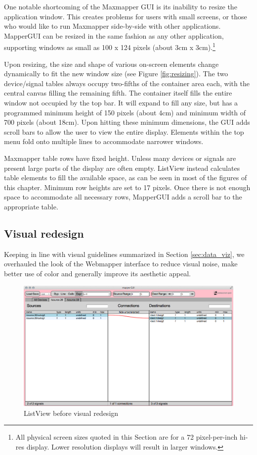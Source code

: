 One notable shortcoming of the Maxmapper GUI is its inability to resize the application window. This creates problems for users with small screens, or those who would like to run Maxmapper side-by-side with other applications. MapperGUI can be resized in the same fashion as any other application, supporting windows as small as 100 x 124 pixels (about 3cm x 3cm).\footnote{All physical screen sizes quoted in this Section are for a 72 pixel-per-inch hi-res display. Lower resolution displays will result in larger windows.}

Upon resizing, the size and shape of various on-screen elements change dynamically to fit the new window size (see Figure \ref{fig:resizing}). The two device/signal tables always occupy two-fifths of the container area each, with the central canvas filling the remaining fifth. The container itself fills the entire window not occupied by the top bar. It will expand to fill any size, but has a programmed minimum height of 150 pixels (about 4cm) and minimum width of 700 pixels (about 18cm). Upon hitting these minimum dimensions, the GUI adds scroll bars to allow the user to view the entire display. Elements within the top menu fold onto multiple lines to accommodate narrower windows.


Maxmapper table rows have fixed height. Unless many devices or signals are present large parts of the display are often empty. ListView instead calculates table elements to fill the available space, as can be seen in most of the figures of this chapter. Minimum row heights are set to 17 pixels. Once there is not enough space to accommodate all necessary rows, MapperGUI adds a scroll bar to the appropriate table. 


	\subsection{Visual redesign} %
	\label{sec:visual_redesign}

Keeping in line with visual guidelines summarized in Section \ref{sec:data_viz}, we overhauled the look of the Webmapper interface to reduce visual noise, make better use of color and generally improve its aesthetic appeal. 

\begin{figure}[h]
\centering
	\includegraphics[width=\textwidth]{figures/before_redesign}
\caption{ListView before visual redesign}
\label{fig:before_redesign}
\end{figure}

